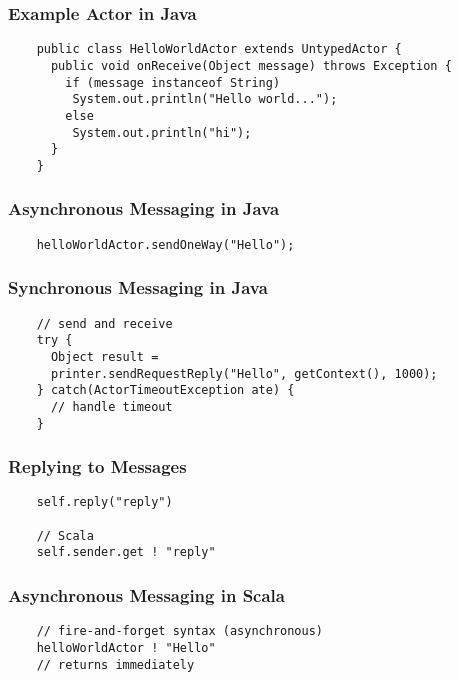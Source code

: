 \documentclass{beamer}
\begin{document}
\begin{frame}[fragile]
  \frametitle{Example Actor in Java}

  \begin{lstlisting}
    public class HelloWorldActor extends UntypedActor {
      public void onReceive(Object message) throws Exception {
        if (message instanceof String)
         System.out.println("Hello world...");
        else
         System.out.println("hi");
      }
    }
  \end{lstlisting}
\end{frame}



\begin{frame}[fragile]
  \frametitle{Asynchronous Messaging in Java}

  \begin{lstlisting}
    helloWorldActor.sendOneWay("Hello");
  \end{lstlisting}
\end{frame}



\begin{frame}[fragile]
  \frametitle{Synchronous Messaging in Java}

  \begin{lstlisting}
    // send and receive
    try {
      Object result =
      printer.sendRequestReply("Hello", getContext(), 1000);
    } catch(ActorTimeoutException ate) {
      // handle timeout
    }
  \end{lstlisting}
\end{frame}


\begin{frame}[fragile]
  \frametitle{Replying to Messages}

  \begin{lstlisting}
    self.reply("reply")

    // Scala
    self.sender.get ! "reply"

  \end{lstlisting}
\end{frame}



\begin{frame}[fragile]
  \frametitle{Asynchronous Messaging in Scala}

  \begin{lstlisting}
    // fire-and-forget syntax (asynchronous)
    helloWorldActor ! "Hello"
    // returns immediately

  \end{lstlisting}
\end{frame}
\end{document}
